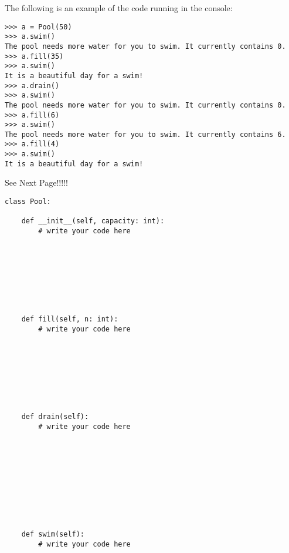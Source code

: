 \documentclass{article}
\begin{document}
\begin{enumerate}
    The following is an example of the code running in the console:

\begin{verbatim}
>>> a = Pool(50)
>>> a.swim()
The pool needs more water for you to swim. It currently contains 0.
>>> a.fill(35)
>>> a.swim()
It is a beautiful day for a swim!
>>> a.drain()
>>> a.swim()
The pool needs more water for you to swim. It currently contains 0.
>>> a.fill(6)
>>> a.swim()
The pool needs more water for you to swim. It currently contains 6.
>>> a.fill(4)
>>> a.swim()
It is a beautiful day for a swim!
\end{verbatim}

\vfill
See Next Page!!!!!

\newpage
\begin{verbatim}
class Pool:

    def __init__(self, capacity: int):
        # write your code here








    def fill(self, n: int):
        # write your code here








    def drain(self):
        # write your code here










    def swim(self):
        # write your code here



\end{verbatim}


\end{enumerate}
\end{document}

